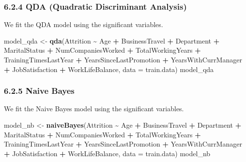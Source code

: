 \documentclass[
]{article}
\newenvironment{Shaded}{\begin{snugshade}}{\end{snugshade}}
\newcommand{\AttributeTok}[1]{\textcolor[rgb]{0.13,0.29,0.53}{#1}}
\newcommand{\FunctionTok}[1]{\textcolor[rgb]{0.13,0.29,0.53}{\textbf{#1}}}
\newcommand{\NormalTok}[1]{#1}
\newcommand{\OtherTok}[1]{\textcolor[rgb]{0.56,0.35,0.01}{#1}}
\newcommand{\SpecialCharTok}[1]{\textcolor[rgb]{0.81,0.36,0.00}{\textbf{#1}}}
\begin{document}
\hypertarget{qda-quadratic-discriminant-analysis}{%
\subsubsection{6.2.4 QDA (Quadratic Discriminant
Analysis)}\label{qda-quadratic-discriminant-analysis}}

We fit the QDA model using the significant variables.

\begin{Shaded}
\begin{Highlighting}[]
\NormalTok{model\_qda }\OtherTok{\textless{}{-}} \FunctionTok{qda}\NormalTok{(Attrition }\SpecialCharTok{\textasciitilde{}} 
\NormalTok{                   Age }\SpecialCharTok{+} 
\NormalTok{                   BusinessTravel }\SpecialCharTok{+} 
\NormalTok{                   Department }\SpecialCharTok{+} 
\NormalTok{                   MaritalStatus }\SpecialCharTok{+} 
\NormalTok{                   NumCompaniesWorked }\SpecialCharTok{+} 
\NormalTok{                   TotalWorkingYears }\SpecialCharTok{+}
\NormalTok{                   TrainingTimesLastYear }\SpecialCharTok{+} 
\NormalTok{                   YearsSinceLastPromotion }\SpecialCharTok{+}
\NormalTok{                   YearsWithCurrManager }\SpecialCharTok{+}
\NormalTok{                   JobSatisfaction }\SpecialCharTok{+}
\NormalTok{                   WorkLifeBalance, }
                 \AttributeTok{data =}\NormalTok{ train.data)}
\NormalTok{model\_qda}
\end{Highlighting}
\end{Shaded}

\hypertarget{naive-bayes}{%
\subsubsection{6.2.5 Naive Bayes}\label{naive-bayes}}

We fit the Naive Bayes model using the significant variables.

\begin{Shaded}
\begin{Highlighting}[]
\NormalTok{model\_nb }\OtherTok{\textless{}{-}} \FunctionTok{naiveBayes}\NormalTok{(Attrition }\SpecialCharTok{\textasciitilde{}} 
\NormalTok{                         Age }\SpecialCharTok{+} 
\NormalTok{                         BusinessTravel }\SpecialCharTok{+} 
\NormalTok{                         Department }\SpecialCharTok{+} 
\NormalTok{                         MaritalStatus }\SpecialCharTok{+} 
\NormalTok{                         NumCompaniesWorked }\SpecialCharTok{+} 
\NormalTok{                         TotalWorkingYears }\SpecialCharTok{+}
\NormalTok{                         TrainingTimesLastYear }\SpecialCharTok{+} 
\NormalTok{                         YearsSinceLastPromotion }\SpecialCharTok{+}
\NormalTok{                         YearsWithCurrManager }\SpecialCharTok{+}
\NormalTok{                         JobSatisfaction }\SpecialCharTok{+}
\NormalTok{                         WorkLifeBalance, }
                       \AttributeTok{data =}\NormalTok{ train.data)}
\NormalTok{model\_nb}
\end{Highlighting}
\end{Shaded}
\end{document}
